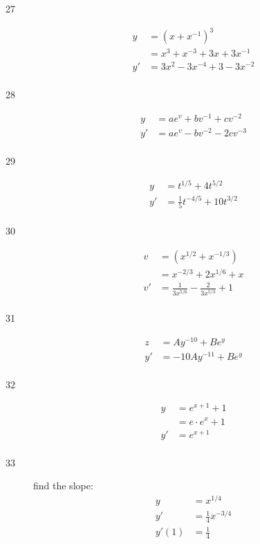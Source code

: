 \documentclass[letterpaper, landscape]{exam}
\begin{document}
\begin{description}
    \item[27] 
      \begin{align*}
        y  & = \left(x + x^{-1} \right)^3 \\
           & = x^3 + x^{-3} + 3x + 3x^{-1} \\
        y' & = \boxed{ 3x^2 - 3x^{-4} + 3 - 3x^{-2} } \\
      \end{align*}

    \item[28] 
      \begin{align*}
        y  & = ae^v + bv^{-1} + cv^{-2} \\
        y' & = \boxed{ ae^v - bv^{-2} - 2cv^{-3} } \\
      \end{align*}

    \item[29] 
      \begin{align*}
        y  & = t^{1/5} + 4t^{5/2} \\
        y' & = \boxed{ \frac{1}{5} t^{-4/5} + 10 t^{3/2} } \\
      \end{align*}

    \item[30] 
      \begin{align*}
        v  & = \left( x^{1/2} + x^{-1/3} \right) \\
           & = x^{-2/3} + 2x^{1/6} + x \\
        v' & = \boxed{ \frac{1}{3 x^{5/6}} - \frac{2}{3 x^{5/3}} + 1 } \\
      \end{align*}

    \item[31] 
      \begin{align*}
        z  & = Ay^{-10} + Be^y \\
        y' & = \boxed{ -10 Ay^{-11} + Be^y } \\
      \end{align*}

    \item[32] 
      \begin{align*}
        y  & = e^{x + 1} + 1 \\
           & = e \cdot e^x + 1 \\
        y' & = \boxed{ e^{x + 1} } \\
      \end{align*}

    \item[33] 
      find the slope: 
      \begin{align*}
        y     & = x^{1/4} \\
        y'    & = \frac{1}{4} x^{-3/4} \\
        y'(1) & = \frac{1}{4} \\
      \end{align*}


\end{description}
\end{document}
